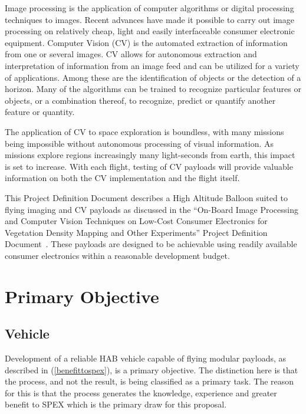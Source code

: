 \documentclass[conference]{IEEEtran} %
\begin{document}
Image processing is the application of computer algorithms or digital processing techniques to images. 
Recent advances have made it possible to carry out image processing on relatively cheap, light and easily interfaceable consumer electronic equipment. 
Computer Vision (CV) is the automated extraction of information from one or several images. 
CV allows for autonomous extraction and interpretation of information from an image feed and can be utilized for a variety of applications. 
Among these are the identification of objects or the detection of a horizon. 
Many of the algorithms can be trained to recognize particular features or objects, or a combination thereof, to recognize, predict or quantify another feature or quantity.

The application of CV to space exploration is boundless, with many missions being impossible without autonomous processing of visual information. 
As missions explore regions increasingly many light-seconds from earth, this impact is set to increase. 
With each flight, testing of CV payloads will provide valuable information on both the CV implementation and the flight itself. 

This Project Definition Document describes a High Altitude Balloon suited to flying imaging and CV payloads as discussed in the ``On-Board Image Processing and Computer Vision Techniques on Low-Cost Consumer Electronics for Vegetation Density Mapping and Other Experiments'' Project Definition Document~\cite{habcvpdd}. 
These payloads are designed to be achievable using readily available consumer electronics within a reasonable development budget. 

\section{Primary Objective}
\label{primaryobjectives}
\subsection{Vehicle}
\label{vehicleobjectives}
Development of a reliable HAB vehicle capable of flying modular payloads, as described in (\autoref{benefittospex}), is a primary objective. 
The distinction here is that the process, and not the result, is being classified as a primary task. 
The reason for this is that the process generates the knowledge, experience and greater benefit to SPEX which is the primary draw for this proposal.
\end{document}
